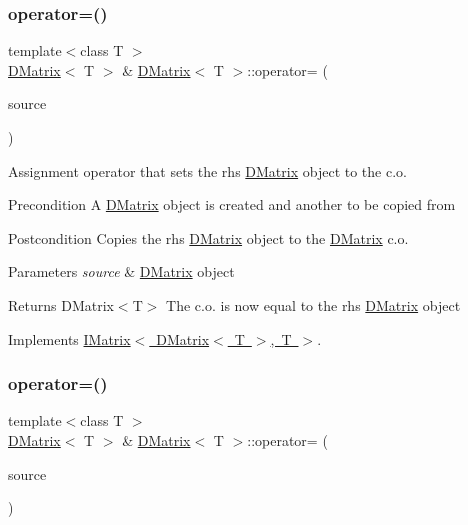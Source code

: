 \subsubsection{\texorpdfstring{operator=()}{operator=()}\hspace{0.1cm}{\footnotesize\ttfamily [1/2]}}
{\footnotesize\ttfamily template$<$class T $>$ \\
\mbox{\hyperlink{class_d_matrix}{D\+Matrix}}$<$ T $>$ \& \mbox{\hyperlink{class_d_matrix}{D\+Matrix}}$<$ T $>$\+::operator= (\begin{DoxyParamCaption}\item[{const \mbox{\hyperlink{class_d_matrix}{D\+Matrix}}$<$ T $>$ \&}]{source }\end{DoxyParamCaption})\hspace{0.3cm}{\ttfamily [virtual]}}



Assignment operator that sets the rhs \mbox{\hyperlink{class_d_matrix}{D\+Matrix}} object to the c.\+o. 

\begin{DoxyPrecond}{Precondition}
A \mbox{\hyperlink{class_d_matrix}{D\+Matrix}} object is created and another to be copied from 
\end{DoxyPrecond}
\begin{DoxyPostcond}{Postcondition}
Copies the rhs \mbox{\hyperlink{class_d_matrix}{D\+Matrix}} object to the \mbox{\hyperlink{class_d_matrix}{D\+Matrix}} c.\+o. 
\end{DoxyPostcond}

\begin{DoxyParams}{Parameters}
{\em source} & \mbox{\hyperlink{class_d_matrix}{D\+Matrix}} object \\
\hline
\end{DoxyParams}
\begin{DoxyReturn}{Returns}
D\+Matrix$<$\+T$>$ The c.\+o. is now equal to the rhs \mbox{\hyperlink{class_d_matrix}{D\+Matrix}} object 
\end{DoxyReturn}


Implements \mbox{\hyperlink{class_i_matrix_a9eeb68de7e1d37d1aab439c78fea9be3}{I\+Matrix$<$ D\+Matrix$<$ T $>$, T $>$}}.

\mbox{\label{class_d_matrix_aee2b82126e42d54f74f7076c998b3c8d}} 
\subsubsection{\texorpdfstring{operator=()}{operator=()}\hspace{0.1cm}{\footnotesize\ttfamily [2/2]}}
{\footnotesize\ttfamily template$<$class T $>$ \\
\mbox{\hyperlink{class_d_matrix}{D\+Matrix}}$<$ T $>$ \& \mbox{\hyperlink{class_d_matrix}{D\+Matrix}}$<$ T $>$\+::operator= (\begin{DoxyParamCaption}\item[{const \mbox{\hyperlink{class_matrix}{Matrix}}$<$ T $>$ \&}]{source }\end{DoxyParamCaption})}




